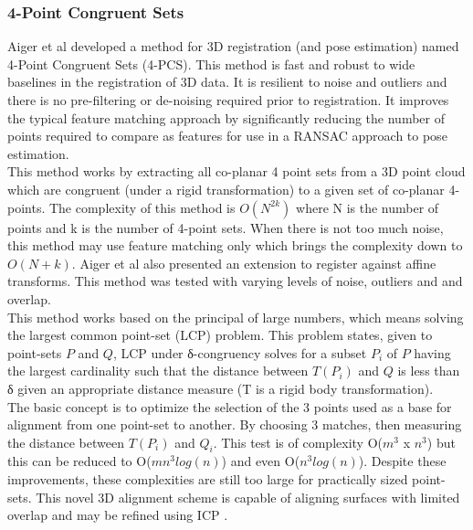 \subsubsection{4-Point Congruent Sets}

Aiger et al \cite{Aiger084} developed a method for 3D registration (and pose estimation) named 4-Point Congruent Sets (4-PCS). This method is fast and robust to wide baselines in the registration of 3D data. It is resilient to noise and outliers and there is no pre-filtering or de-noising required prior to registration. It improves the typical feature matching approach by significantly reducing the number of points required to compare as features for use in a RANSAC approach to pose estimation. \\

This method works by extracting all co-planar 4 point sets from a 3D point cloud which are congruent (under a rigid transformation) to a given set of co-planar 4-points. The complexity of this method is $O(N^{2k})$ where N is the number of points and k is the number of 4-point sets. When there is not too much noise, this method may use feature matching only which brings the complexity down to $O(N+k)$. Aiger et al also presented an extension to register against affine transforms. This method was tested with varying levels of noise, outliers and and overlap. \\

This method works based on the principal of large numbers, which means solving the largest common point-set (LCP) problem. This problem states, given to point-sets $P$ and $Q$, LCP under δ-congruency solves for a subset $P_i$ of $P$ having the largest cardinality such that the distance between $T(P_i)$ and $Q$  is less than δ given an appropriate distance measure (T is a rigid body transformation). \\

The basic concept is to optimize the selection of the 3 points used as a base for alignment from one point-set to another. By choosing 3 matches, then measuring the distance between $T(P_i)$ and $Q_i$. This test is of complexity  O($m^3$ x $n^3$) but this can be reduced to  O($mn^3 log(n)$) \cite{Irani96Combinatorial} and even O($n^3 log(n)$). Despite these improvements, these complexities are still too large for practically sized point-sets. This novel 3D alignment scheme is capable of aligning surfaces with limited overlap and may be refined using ICP \cite{Rusinkiewicz01Efficient}. \\


